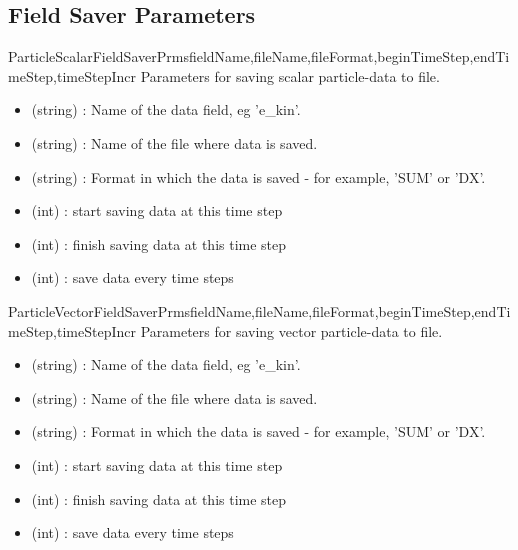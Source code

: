 \documentclass{manual}
\begin{document}
\subsection{Field Saver Parameters}
\label{subsec::fieldsaverparams}

\begin{classdesc}{ParticleScalarFieldSaverPrms}{fieldName,fileName,fileFormat,beginTimeStep,endTimeStep,timeStepIncr}
Parameters for saving scalar particle-data to file.
\begin{itemize}
\item {} (string) : Name of the data field, eg 'e_kin'.
\item {} (string) : Name of the file where data is saved.
\item {} (string) : Format in which the data is saved - for example, 'SUM' or 'DX'.
\item {} (int) : start saving data at this time step
\item {} (int) : finish saving data at this time step
\item {} (int) : save data every  time steps
\end{itemize}
\end{classdesc}

\begin{classdesc}{ParticleVectorFieldSaverPrms}{fieldName,fileName,fileFormat,beginTimeStep,endTimeStep,timeStepIncr}
Parameters for saving vector particle-data to file.
\begin{itemize}
\item {} (string) : Name of the data field, eg 'e_kin'.
\item {} (string) : Name of the file where data is saved.
\item {} (string) : Format in which the data is saved - for example, 'SUM' or 'DX'.
\item {} (int) : start saving data at this time step
\item {} (int) : finish saving data at this time step
\item {} (int) : save data every  time steps
\end{itemize}
\end{classdesc}
\end{document}
